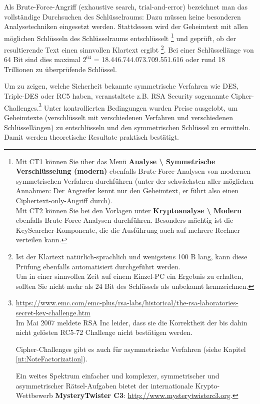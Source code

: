 \begin{refsegment}
\begin{sloppypar}
Als Brute-Force-Angriff (exhaustive search, trial-and-error) bezeichnet
man das vollständige Durchsuchen des Schlüsselraums: Dazu müssen
keine besonderen Analysetechniken eingesetzt werden. Stattdessen wird
der Geheimtext mit allen möglichen Schlüsseln des Schlüsselraums
entschlüsselt%
\footnote{%
  Mit CT1 können Sie über das Menü
  \textbf{Analyse \textbackslash{} Symmetrische Verschlüsselung (modern)}
  ebenfalls Brute-Force-Analysen von modernen symmetrischen Verfahren
  durchführen (unter der schwächsten aller möglichen Annahmen: Der
  Angreifer kennt nur den Geheimtext, er führt also einen
  Ciphertext-only-Angriff durch).\\
  Mit CT2 können Sie bei den Vorlagen unter
  \textbf{Kryptoanalyse \textbackslash{} Modern} ebenfalls Brute-Force-Analysen
  durchführen. Besonders mächtig ist die KeySearcher-Komponente, die
  die Ausführung auch auf mehrere Rechner verteilen kann.
}
und geprüft, ob der resultierende Text einen sinnvollen
Klartext ergibt%
\footnote{%
  Ist der Klartext natürlich-sprachlich und wenigstens 100 B lang, kann
  diese Prüfung ebenfalls automatisiert durchgeführt werden.\\
  Um in einer sinnvollen Zeit auf einem Einzel-PC ein Ergebnis zu
  erhalten, sollten Sie nicht mehr als 24 Bit des Schlüssels als
  unbekannt kennzeichnen.}.
Bei einer Schlüssellänge von 64 Bit sind dies maximal
$2^{64}$ = 18.446.744.073.709.551.616 oder rund 18 Trillionen zu
überprüfende Schlüssel.
\end{sloppypar}

Um zu zeigen, welche Sicherheit bekannte symmetrische Verfahren wie
DES, Triple-DES oder RC5
haben, veranstaltete z.B. RSA Security
sogenannte Cipher-Challenges.\footnote{%
  \url{https://www.emc.com/emc-plus/rsa-labs/historical/the-rsa-laboratories-secret-key-challenge.htm}\\
  Im Mai 2007 meldete RSA Inc leider, dass sie die Korrektheit der bis dahin
  nicht gelösten RC5-72 Challenge nicht bestätigen werden.

  Cipher-Challenges gibt es auch für asymmetrische Verfahren
  (siehe Kapitel \ref{nt:NoteFactorization}).

  Ein weites Spektrum einfacher und komplexer, symmetrischer und asymmetrischer
  Rätsel-Aufgaben bietet der internationale Krypto-Wettbewerb
  \textbf{MysteryTwister C3}: %
  \url{http://www.mysterytwisterc3.org}.
  }
Unter kontrollierten Bedingungen wurden Preise ausgelobt, um Geheimtexte
(verschlüsselt mit verschiedenen Verfahren und verschiedenen
Schlüssellängen) zu entschlüsseln und den symmetrischen Schlüssel
zu ermitteln. Damit werden theoretische Resultate praktisch bestätigt.


\end{refsegment}
